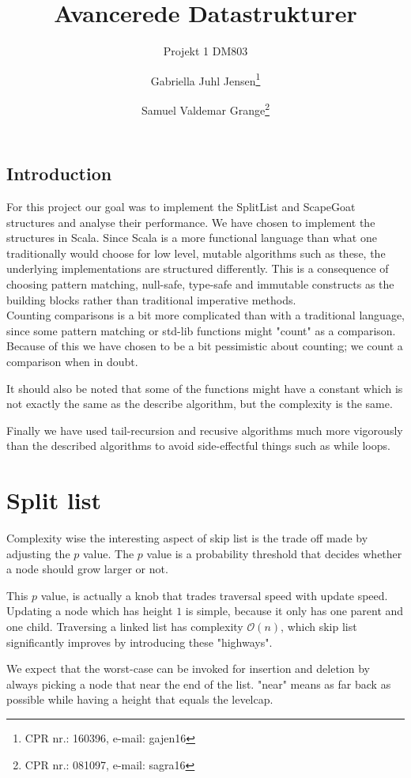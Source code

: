 \documentclass[oneside]{scrbook}
\title{Avancerede Datastrukturer}
\subtitle{Projekt 1 DM803}
\author{Gabriella Juhl Jensen\thanks{CPR nr.: 160396, e-mail: gajen16} \and Samuel Valdemar Grange\thanks{CPR nr.: 081097, e-mail: sagra16} }
\begin{document}
\maketitle
\section*{Introduction}
For this project our goal was to implement the SplitList and ScapeGoat structures and analyse their performance.
We have chosen to implement the structures in Scala.
Since Scala is a more functional language than what one traditionally would choose for low level, mutable algorithms such as these,
the underlying implementations are structured differently.
This is a consequence of choosing pattern matching, null-safe, type-safe and immutable constructs as the building blocks rather than traditional imperative methods.
\\

Counting comparisons is a bit more complicated than with a traditional language, since some pattern matching or std-lib functions might "count" as a comparison.
Because of this we have chosen to be a bit pessimistic about counting;
we count a comparison when in doubt.

It should also be noted that some of the functions might have a constant which is not exactly the same as the describe algorithm, but the complexity is the same.

Finally we have used tail-recursion and recusive algorithms much more vigorously than the described algorithms to avoid side-effectful things such as while loops.

\chapter{Split list}
Complexity wise the interesting aspect of skip list is the trade off made by adjusting the $p$ value.
The $p$ value is a probability threshold that decides whether a node should grow larger or not.

This $p$ value, is actually a knob that trades traversal speed with update speed.
Updating a node which has height $1$ is simple, because it only has one parent and one child.
Traversing a linked list has complexity $\mathcal{O}(n)$, which skip list significantly improves by introducing these "highways".

We expect that the worst-case can be invoked for insertion and deletion by always picking a node that near the end of the list.
"near" means as far back as possible while having a height that equals the levelcap.
\end{document}
